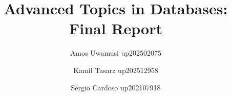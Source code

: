 \documentclass[10pt,a4paper]{article}
\title{\textbf{Advanced Topics in Databases: Final Report}}
\author{Amos Uwamusi up202502075
\and    Kamil Tasarz up202512958
\and    S\'{e}rgio Cardoso up202107918}
\begin{document}
\maketitle




\appendix 
\newpage
\setcounter{page}{1}
\renewcommand{\thepage}{A-\arabic{page}}

\end{document}
